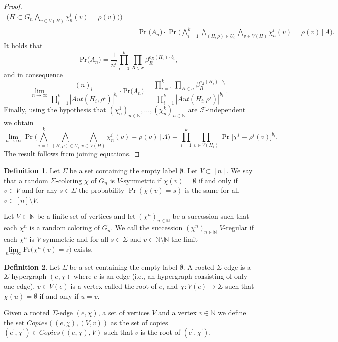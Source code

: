 \documentclass[12pt,notitlepage,a4paper]{article}
\theoremstyle{definition}
\newtheorem{definition}{Definition}[section]
\newcommand{\N}{\mathbb{N}}
\newcommand{\Ln}{\lim\limits_{n\to \infty}}
\newcommand{\PR}[1]{\mathrm{Pr}\big(#1\big)}
\begin{document}
\begin{proof}
\begin{align*}
	\big(H\subset G_n \bigwedge_{v\in V(H)} \chi_n^i(v)=\rho(v) \big) \Big)=\\
	&\Pr\big(A_n\big)\cdot \Pr\big(\bigwedge_{i=1}^k \bigwedge_{(H,\rho)\in U_i} 
	\bigwedge_{v\in V(H)} \chi^i_n(v)=\rho(v) \, \big| \, A \big).
	\end{align*}
	It holds that
	\[
	\PR{A_n}=\frac{1}{n^l} \prod_{i=1}^{k}\prod_{R\in \sigma} \beta_R^{e_R(H_i)\cdot b_i},
	\]
	and in consequence 
	\[
	\Ln \frac{(n)_l}{\prod_{i=1}^k |Aut(H_i,\rho^i)|^{b_i}}\cdot \PR{A_n}
	= \frac{\prod_{i=1}^{k}\prod_{R\in \sigma} \beta_R^{e_R(H_i)\cdot b_i}}
	{\prod_{i=1}^k |Aut(H_i,\rho^i)|^{b_i}}.
	\]
	Finally, using the hypothesis that 
	$(\chi^1_n)_{n\in\N}, \dots, (\chi^k_n)_{n\in\N}$
	are $\mathcal{F}$-independent we obtain
	\[
	\Ln \Pr\big(\bigwedge_{i=1}^k \bigwedge_{(H,\rho)\in U_i} 
	\bigwedge_{v\in V(H)} \chi^i_n(v)=\rho(v) \, \big| \, A \big)
	= \prod_{i=1}^{k} \prod_{v\in V(H_i)} \Pr\big[ \chi^i=\rho^i(v)\big]^{b_i}.
	\]
	The result follows from joining equations. 
\end{proof}

\begin{definition}
	Let $\Sigma$ be a set containing the empty label $\emptyset$.
	Let $V\subset [n]$. We say that a random $\Sigma$-coloring $\chi$
	of $G_n$ is $V$-symmetric if $\chi(v)=\emptyset$ if and only if $v\in V$ and
	for any $s\in \Sigma$ the probability $\Pr(\chi(v)=s)$ is the same for all 
	$v\in [n]\setminus V$. \par
	Let $V\subset \N$ be a finite set of vertices and let $(\chi^n)_{n\in \N}$
	be a succession such that each $\chi^n$ is a random coloring of $G_n$. We
	call the succession $(\chi^n)_{n\in \N}$ $V$-regular if each $\chi^n$ is
	$V$-symmetric and for all $s\in \Sigma$ and $v\in \N \setminus \N$ the limit 
	$\Ln \PR{\chi^n(v)=s}$ exists. 
\end{definition}

\begin{definition}
	Let $\Sigma$ be a set containing the empty label $\emptyset$. A rooted $\Sigma$-edge
	is a $\Sigma$-hypergraph $(e,\chi)$ where $e$ is an edge 
	(i.e., an hypergraph consisting of only one edge), $v\in V(e)$ is a vertex called the root 
	of $e$, and $\chi: V(e)\rightarrow \Sigma$ such that $\chi(u)=\emptyset$ if and only if 
	$u=v$.\par
	Given a rooted $\Sigma$-edge $(e,\chi)$, a set of vertices $V$ and a vertex $v\in \N$
	we define the set $Copies((e,\chi),(V,v))$ as the set of copies 
	$(e^\prime, \chi^\prime) \in  Copies((e,\chi),V)$ such that $v$ is
	 the root of $(e^\prime,\chi^\prime)$.
\end{definition}
\end{document}
